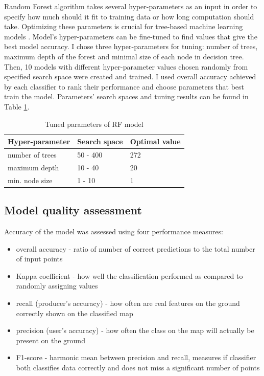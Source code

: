 \documentclass{amuthesis}
\begin{document}
Random Forest algorithm takes several hyper-parameters as an input in
order to specify how much should it fit to training data or how long
computation should take. Optimizing these parameters is crucial for
tree-based machine learning models \autocite{yang_hyperparameter_2020}.
Model's hyper-parameters can be fine-tuned to find values that give the
best model accuracy. I chose three hyper-parameters for tuning: number
of trees, maximum depth of the forest and minimal size of each node in
decision tree. Then, 10 models with different hyper-parameter values
chosen randomly from specified search space were created and trained. I
used overall accuracy achieved by each classifier to rank their
performance and choose parameters that best train the model. Parameters'
search spaces and tuning results can be found in Table
\ref{tbl-tabela3}.

\hypertarget{tbl-tabela3}{}
\begin{table}
\caption{\label{tbl-tabela3}Tuned parameters of RF model }\tabularnewline

\centering
\begin{tabular}{|>{}l|>{}l|>{}l|}
\toprule
\textbf{Hyper-parameter} & \textbf{Search space} & \textbf{Optimal value}\\
\midrule
number of trees & 50 - 400 & 272\\
\hline
maximum depth & 10 - 40 & 20\\
\hline
min. node size & 1 - 10 & 1\\
\bottomrule
\end{tabular}
\end{table}

\hypertarget{sec-resampling}{%
\subsection{Model quality assessment}\label{sec-resampling}}

Accuracy of the model was assessed using four performance measures:

\begin{itemize}
\item
  overall accuracy - ratio of number of correct predictions to the total
  number of input points
\item
  Kappa coefficient - how well the classification performed as compared
  to randomly assigning values
\item
  recall (producer's accuracy) - how often are real features on the
  ground correctly shown on the classified map
\item
  precision (user's accuracy) - how often the class on the map will
  actually be present on the ground
\item
  F1-score - harmonic mean between precision and recall, measures if
  classifier both classifies data correctly and does not miss a
  significant number of points
\end{itemize}
\end{document}
